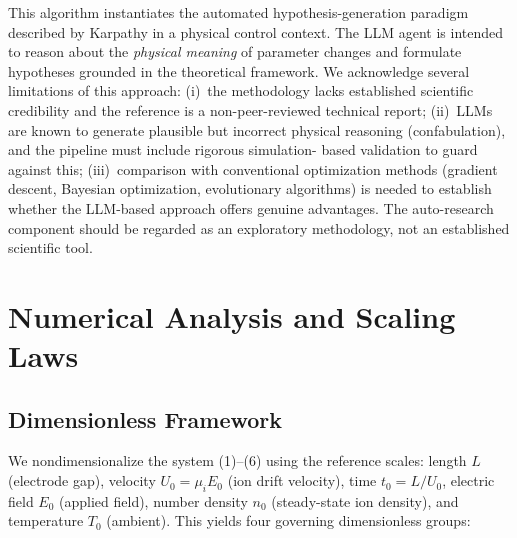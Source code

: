 \documentclass[12pt,twocolumn]{article}
\begin{document}
This algorithm instantiates the automated hypothesis-generation
paradigm described by Karpathy \cite{Karpathy2025} in a physical
control context. The LLM agent is intended to reason about the
\emph{physical meaning} of parameter changes and formulate hypotheses
grounded in the theoretical framework. We acknowledge several
limitations of this approach: (i)~the methodology lacks established
scientific credibility and the reference \cite{Karpathy2025} is
a non-peer-reviewed technical report; (ii)~LLMs are known to
generate plausible but incorrect physical reasoning
(confabulation), and the pipeline must include rigorous simulation-
based validation to guard against this; (iii)~comparison with
conventional optimization methods (gradient descent, Bayesian
optimization, evolutionary algorithms) is needed to establish whether
the LLM-based approach offers genuine advantages. The auto-research
component should be regarded as an exploratory methodology, not an
established scientific tool.

\section{Numerical Analysis and Scaling Laws}
\label{sec:numerical}

\subsection{Dimensionless Framework}
\label{sec:numerical:nondim}

We nondimensionalize the system (1)--(6) using the reference scales:
length $L$ (electrode gap), velocity $U_0 = \mu_i E_0$ (ion drift
velocity), time $t_0 = L/U_0$, electric field $E_0$ (applied field),
number density $n_0$ (steady-state ion density), and temperature
$T_0$ (ambient). This yields four governing dimensionless groups:
\end{document}
